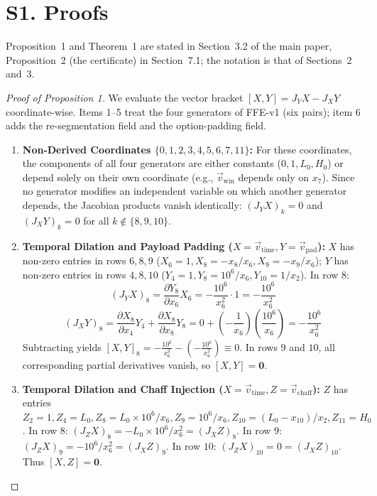 \section*{S1. Proofs}
Proposition~1 and Theorem~1 are stated in Section~3.2 of the main paper, Proposition~2 (the certificate) in Section~7.1; the notation is that of Sections~2 and~3.


\begin{proof}[Proof of Proposition 1]
We evaluate the vector bracket $[X, Y] = J_Y X - J_X Y$ coordinate-wise. Items 1--5 treat the four generators of FFE-v1 (six pairs); item 6 adds the re-segmentation field and the option-padding field.
\begin{enumerate}
    \item \textbf{Non-Derived Coordinates $\{0, 1, 2, 3, 4, 5, 6, 7, 11\}$:} For these coordinates, the components of all four generators are either constants ($0, 1, L_0, H_0$) or depend solely on their own coordinate (e.g., $\vec{v}_{\text{win}}$ depends only on $x_7$). Since no generator modifies an independent variable on which another generator depends, the Jacobian products vanish identically: $(J_Y X)_k = 0$ and $(J_X Y)_k = 0$ for all $k \notin \{8, 9, 10\}$.
    \item \textbf{Temporal Dilation and Payload Padding ($X = \vec{v}_{\text{time}}, Y = \vec{v}_{\text{pad}}$):} $X$ has non-zero entries in rows $6, 8, 9$ ($X_6 = 1, X_8 = -x_8/x_6, X_9 = -x_9/x_6$); $Y$ has non-zero entries in rows $4, 8, 10$ ($Y_4 = 1, Y_8 = 10^6/x_6, Y_{10} = 1/x_2$).
    In row $8$:
    \begin{equation}
        (J_Y X)_8 = \frac{\partial Y_8}{\partial x_6} X_6 = -\frac{10^6}{x_6^2} \cdot 1 = -\frac{10^6}{x_6^2}
    \end{equation}
    \begin{equation}
        (J_X Y)_8 = \frac{\partial X_8}{\partial x_4} Y_4 + \frac{\partial X_8}{\partial x_8} Y_8 = 0 + \left(-\frac{1}{x_6}\right)\left(\frac{10^6}{x_6}\right) = -\frac{10^6}{x_6^2}
    \end{equation}
    Subtracting yields $[X, Y]_8 = -\frac{10^6}{x_6^2} - \left(-\frac{10^6}{x_6^2}\right) \equiv 0$. In rows $9$ and $10$, all corresponding partial derivatives vanish, so $[X, Y] = \mathbf{0}$.
    \item \textbf{Temporal Dilation and Chaff Injection ($X = \vec{v}_{\text{time}}, Z = \vec{v}_{\text{chaff}}$):} $Z$ has entries $Z_2 = 1, Z_4 = L_0, Z_8 = L_0 \times 10^6/x_6, Z_9 = 10^6/x_6, Z_{10} = (L_0 - x_{10})/x_2, Z_{11} = H_0$. In row $8$: $(J_Z X)_8 = -L_0 \times 10^6 / x_6^2 = (J_X Z)_8$. In row $9$: $(J_Z X)_9 = -10^6 / x_6^2 = (J_X Z)_9$. In row $10$: $(J_Z X)_{10} = 0 = (J_X Z)_{10}$. Thus $[X, Z] = \mathbf{0}$.

\end{enumerate}
\end{proof}

